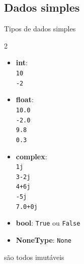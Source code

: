 \subsection{Dados simples}
\begin{frame}{Tipos de dados simples}%
		
	\begin{multicols}{2}			
	\begin{itemize}%
		
		\item \textbf{int}:
			\\ \texttt{10}
			\\ \texttt{-2}
			
		\item \textbf{float}:	
			\\ \texttt{10.0}
			\\ \texttt{-2.0}
			\\ \texttt{9.8}
			\\ \texttt{0.3}
			
		\item \textbf{complex}:	
			\\ \texttt{1j}
			\\ \texttt{3-2j}
			\\ \texttt{4+6j}
			\\ \texttt{-5j}
			\\ \texttt{7.0+0j}
		
		\vfill	
			
		\item \textbf{bool}:	
			\texttt{True}
			ou 
			\texttt{False}
			
		\item \textbf{NoneType}:	
			\texttt{None}
			
		
	\end{itemize}
	\end{multicols}
	
	{\color{purple} são todos imutáveis}
  \end{frame}

